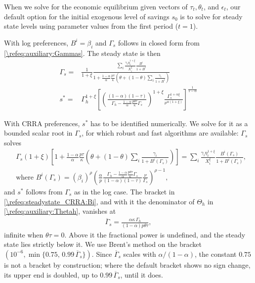 When we solve for the economic equilibrium given vectors of $\tau_t, \theta_t$, and $\epsilon_t$, our default option for the initial exogenous level of savings $s_0$ is to solve for steady state levels using parameter values from the first period ($t=1$).

With log preferences, $B^i = \beta_i$ and $\Gamma_{s}$ follows in closed form from \eqref{\refeq:auxiliary:Gammas}. The steady state is then
\begin{subequations}\label{\refeq:steadystate_LOG}
    \begin{align}
        \Gamma_s =& \frac{1}{1+\xi}\frac{\sum_i \frac{\gamma_{i}\eta_{i}^{1+\xi}}{X_{i}^{\xi}}\frac{B^i}{1+B^i}}{1+\frac{1-\alpha}{\alpha}\frac{p\tau}{\kappa}\left(\theta+(1-\theta)\sum_i\frac{\gamma_{i}}{1+B^i}\right)} \label{\refeq:steadystate_LOG:Gammas}\\
         s^* =& \Gamma_h^{1+\xi}\left[\left(\frac{(1-\alpha)(1-\tau)}{\Gamma_h-\frac{1-\alpha}{\alpha}\frac{p\theta\tau}{\kappa}\Gamma_s}\right)^{1+\xi}\frac{\Gamma_s^{1+\alpha\xi}}{\nu^{\alpha(1+\xi)}}\right]^{\frac{1}{1-\alpha}} \label{\refeq:steadystate_LOG:s}
    \end{align}
\end{subequations}

With CRRA preferences, $s^*$ has to be identified numerically. We solve for it as a bounded scalar root in $\Gamma_s$, for which robust and fast algorithms are available: $\Gamma_s$ solves
\begin{subequations}\label{\refeq:steadystate_CRRA}
\begin{align}
    &\Gamma_s(1+\xi)\left[1+\frac{1-\alpha}{\alpha}\frac{p\tau}{\kappa}\left(\theta+(1-\theta)\sum_i\frac{\gamma_i}{1+B^i(\Gamma_s)}\right)\right] = \sum_i\frac{\gamma_i\eta_i^{1+\xi}}{X_i^{\xi}} \frac{B^i(\Gamma_s)}{1+B^i(\Gamma_s)}, \label{\refeq:steadystate_CRRA:Gammas} \\
    &\text{where }B^i(\Gamma_s) = \left(\beta_i\right)^{\rho} \left(\frac{\alpha}{p}\frac{\Gamma_h-\frac{1-\alpha}{\alpha}\frac{p\theta\tau}{\kappa}\Gamma_s}{(1-\alpha)(1-\tau)}\frac{\nu}{\Gamma_s}   \right)^{\rho-1}, \label{\refeq:steadystate_CRRA:Bi}
\end{align}
\end{subequations}
and $s^*$ follows from $\Gamma_s$ as in the log case. The bracket in \eqref{\refeq:steadystate_CRRA:Bi}, and with it the denominator of $\Theta_h$ in \eqref{\refeq:auxiliary:Thetah}, vanishes at
\begin{align*}
    \overline{\Gamma}_s = \frac{\alpha\kappa\,\Gamma_h}{(1-\alpha)p\theta\tau},
\end{align*}
infinite when $\theta\tau = 0$. Above it the fractional power is undefined, and the steady state lies strictly below it. We use Brent's method on the bracket $\left(10^{-6}, \min\lbrace 0.75,\, 0.99\,\overline{\Gamma}_s\rbrace\right)$. Since $\overline{\Gamma}_s$ scales with $\alpha/(1-\alpha)$, the constant $0.75$ is not a bracket by construction; where the default bracket shows no sign change, its upper end is doubled, up to $0.99\,\overline{\Gamma}_s$, until it does.
